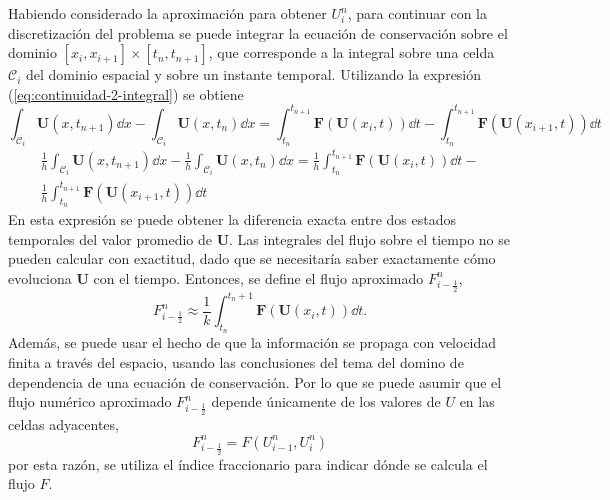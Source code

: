 Habiendo considerado la aproximación para obtener $U_i^n$, para continuar con la discretización del problema se puede integrar la ecuación de conservación sobre el dominio $[x_i,x_{i+1}] \times [t_n, t_{n+1}]$, que corresponde a la integral sobre una celda $\mathcal{C}_i$ del dominio espacial y sobre un instante temporal. Utilizando la expresión (\ref{eq:continuidad-2-integral}) se obtiene
\begin{equation}
	\int_{\mathcal{C}_i}\mathbf{U}(x, t_{n+1})\dd{x} - \int_{\mathcal{C}_i}\mathbf{U}(x, t_{n})\dd{x} = \int_{t_n}^{t_{n+1}}\mathbf{F}(\mathbf{U}(x_i,t))\dd{t} - \int_{t_n}^{t_{n+1}}\mathbf{F}(\mathbf{U}(x_{i+1},t))\dd{t}
\end{equation}
\begin{equation}
	\begin{aligned}
		\frac{1}{h}\int_{\mathcal{C}_i}\mathbf{U}(x, t_{n+1})\dd{x} - \frac{1}{h}\int_{\mathcal{C}_i}\mathbf{U}(x, t_{n})\dd{x} = 
		\frac{1}{h}\int_{t_n}^{t_{n+1}}\mathbf{F}(\mathbf{U}(x_i,t))\dd{t} -\\ \frac{1}{h}\int_{t_n}^{t_{n+1}}\mathbf{F}(\mathbf{U}(x_{i+1},t))\dd{t}
	\end{aligned}
\label{eq:integralsobreceldas}
\end{equation}
En esta expresión se puede obtener la diferencia exacta entre dos estados temporales del valor promedio de $\mathbf{U}$. Las integrales del flujo sobre el tiempo no se pueden calcular con exactitud, dado que se necesitaría saber exactamente cómo evoluciona $\mathbf{U}$ con el tiempo. Entonces, se define el flujo aproximado $F_{i-\frac{1}{2}}^n$,
\begin{equation}
	F_{i-\frac{1}{2}}^n \approx \frac{1}{k} \int_{t_n}^{t_n+1} \mathbf{F}(\mathbf{U}(x_i,t)) \dd{t}.
	\label{eq:flujo-numerico}
\end{equation}
Además, se puede usar el hecho de que la información se propaga con velocidad finita a través del espacio, usando las conclusiones del tema del domino de dependencia de una ecuación de conservación. Por lo que se puede asumir que el flujo numérico aproximado $F_{i-\frac{1}{2}}^n$ depende únicamente de los valores de $U$ en las celdas adyacentes,
\begin{equation}
	F_{i-\frac{1}{2}}^n = F(U_{i-1}^n, U_i^n)
\end{equation} 
por esta razón, se utiliza el índice fraccionario para indicar dónde se calcula el flujo $F$. 

